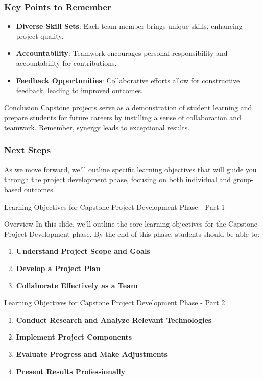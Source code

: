 \documentclass[aspectratio=169]{beamer}
\begin{document}
\begin{frame}[fragile]
    \frametitle{Key Points to Remember}
    \begin{itemize}
        \item \textbf{Diverse Skill Sets}: Each team member brings unique skills, enhancing project quality.
        \item \textbf{Accountability}: Teamwork encourages personal responsibility and accountability for contributions.
        \item \textbf{Feedback Opportunities}: Collaborative efforts allow for constructive feedback, leading to improved outcomes.
    \end{itemize}
    
    \begin{block}{Conclusion}
        Capstone projects serve as a demonstration of student learning and prepare students for future careers by instilling a sense of collaboration and teamwork.
        Remember, synergy leads to exceptional results.
    \end{block}
\end{frame}

\begin{frame}[fragile]
    \frametitle{Next Steps}
    As we move forward, we'll outline specific learning objectives that will guide you through the project development phase, focusing on both individual and group-based outcomes.
\end{frame}

\begin{frame}[fragile]{Learning Objectives for Capstone Project Development Phase - Part 1}
  \begin{block}{Overview}
    In this slide, we'll outline the core learning objectives for the Capstone Project Development phase. By the end of this phase, students should be able to:
  \end{block}
  
  \begin{enumerate}
    \item \textbf{Understand Project Scope and Goals}
    \item \textbf{Develop a Project Plan}
    \item \textbf{Collaborate Effectively as a Team}
  \end{enumerate}
\end{frame}

\begin{frame}[fragile]{Learning Objectives for Capstone Project Development Phase - Part 2}
  \begin{enumerate}[resume]
    \item \textbf{Conduct Research and Analyze Relevant Technologies}
    \item \textbf{Implement Project Components}
    \item \textbf{Evaluate Progress and Make Adjustments}
    \item \textbf{Present Results Professionally}
  \end{enumerate}
\end{frame}
\end{document}
